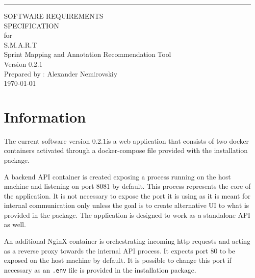 \documentclass{scrreprt}
\date{}
\begin{document}
	
\newcommand{\version}[0]{0.2.1}
\newcommand{\proxy}[0]{\texttt{proxy.conf}}
\newcommand{\jaxb}[0]{\texttt{jaxb_impl-0.1.3.jar}}
\newcommand{\model}[0]{\texttt{model.bin}}

\begin{flushright}
	\rule{16cm}{5pt}\vskip1cm
	\begin{bfseries}
		\Huge{SOFTWARE REQUIREMENTS\\ SPECIFICATION}\\
		\vspace{1.5cm}
		for\\
		\vspace{1.5cm}
		S.M.A.R.T\\
		\large{Sprint Mapping and Annotation Recommendation Tool\\}
		\vspace{1.5cm}
		\LARGE{Version \version}\\
		\vspace{5cm}
		Prepared by : Alexander Nemirovskiy\\
		\today\\
	\end{bfseries}
\end{flushright}

\pagebreak
\section[1]{Information}
\paragraph{}The current software version \version \space is a web application that consists of two docker containers activated through a docker-compose file provided with the installation package. 

A backend API container is created exposing a process running on the host machine and listening on port 8081 by default. This process represents the core of the application. It is not necessary to expose the port it is using as it is meant for internal communication only unless the goal is to create alternative UI to what is provided in the package. The application is designed to work as a standalone API as well.

An additional NginX container is orchestrating incoming http requests and acting as a reverse proxy towards the internal API process. It expects port 80 to be exposed on the host machine by default. It is possible to change this port if necessary as an \texttt{.env} file is provided in the installation package. 
\end{document}
